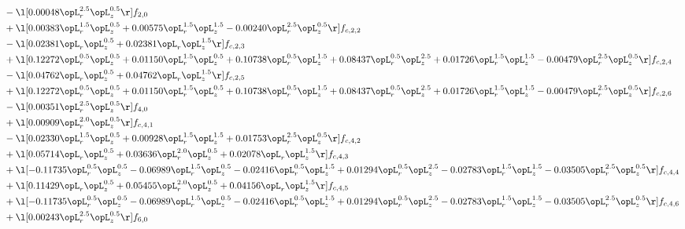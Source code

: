 \begin{alignat}{2}
& - \l[  0.00048 \opL_r^{2.5} \opL_z^{0.5}  \r] f_{2,0} \nonumber \\ 
& + \l[  0.00383 \opL_r^{1.5} \opL_z^{0.5} +  0.00575 \opL_r^{1.5} \opL_z^{1.5}   -0.00240 \opL_r^{2.5} \opL_z^{0.5}  \r] f_{c,2,2} \nonumber \\ 
& - \l[  0.02381 \opL_r \opL_z^{0.5} +  0.02381 \opL_r \opL_z^{1.5}  \r] f_{c,2,3} \nonumber \\ 
& + \l[  0.12272 \opL_r^{0.5} \opL_z^{0.5} +  0.01150 \opL_r^{1.5} \opL_z^{0.5} +  0.10738 \opL_r^{0.5} \opL_z^{1.5} +  0.08437 \opL_r^{0.5} \opL_z^{2.5} +  0.01726 \opL_r^{1.5} \opL_z^{1.5}   -0.00479 \opL_r^{2.5} \opL_z^{0.5}  \r] f_{c,2,4} \nonumber \\ 
& - \l[  0.04762 \opL_r \opL_z^{0.5} +  0.04762 \opL_r \opL_z^{1.5}  \r] f_{c,2,5} \nonumber \\ 
& + \l[  0.12272 \opL_r^{0.5} \opL_z^{0.5} +  0.01150 \opL_r^{1.5} \opL_z^{0.5} +  0.10738 \opL_r^{0.5} \opL_z^{1.5} +  0.08437 \opL_r^{0.5} \opL_z^{2.5} +  0.01726 \opL_r^{1.5} \opL_z^{1.5}   -0.00479 \opL_r^{2.5} \opL_z^{0.5}  \r] f_{c,2,6} \nonumber \\ 
& - \l[  0.00351 \opL_r^{2.5} \opL_z^{0.5}  \r] f_{4,0} \nonumber \\ 
& + \l[  0.00909 \opL_r^{2.0} \opL_z^{0.5}  \r] f_{c,4,1} \nonumber \\ 
& - \l[  0.02330 \opL_r^{1.5} \opL_z^{0.5} +  0.00928 \opL_r^{1.5} \opL_z^{1.5} +  0.01753 \opL_r^{2.5} \opL_z^{0.5}  \r] f_{c,4,2} \nonumber \\ 
& + \l[  0.05714 \opL_r \opL_z^{0.5} +  0.03636 \opL_r^{2.0} \opL_z^{0.5} +  0.02078 \opL_r \opL_z^{1.5}  \r] f_{c,4,3} \nonumber \\ 
& + \l[  -0.11735 \opL_r^{0.5} \opL_z^{0.5}   -0.06989 \opL_r^{1.5} \opL_z^{0.5}   -0.02416 \opL_r^{0.5} \opL_z^{1.5} +  0.01294 \opL_r^{0.5} \opL_z^{2.5}   -0.02783 \opL_r^{1.5} \opL_z^{1.5}   -0.03505 \opL_r^{2.5} \opL_z^{0.5}  \r] f_{c,4,4} \nonumber \\ 
& + \l[  0.11429 \opL_r \opL_z^{0.5} +  0.05455 \opL_r^{2.0} \opL_z^{0.5} +  0.04156 \opL_r \opL_z^{1.5}  \r] f_{c,4,5} \nonumber \\ 
& + \l[  -0.11735 \opL_r^{0.5} \opL_z^{0.5}   -0.06989 \opL_r^{1.5} \opL_z^{0.5}   -0.02416 \opL_r^{0.5} \opL_z^{1.5} +  0.01294 \opL_r^{0.5} \opL_z^{2.5}   -0.02783 \opL_r^{1.5} \opL_z^{1.5}   -0.03505 \opL_r^{2.5} \opL_z^{0.5}  \r] f_{c,4,6} \nonumber \\ 
& + \l[  0.00243 \opL_r^{2.5} \opL_z^{0.5}  \r] f_{6,0} \nonumber \\ 

\end{alignat}
